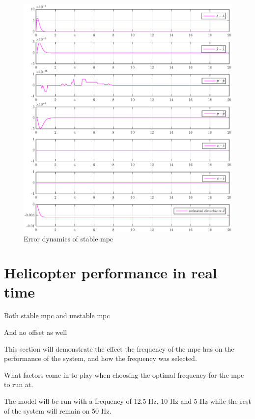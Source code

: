 \begin{figure}[h!]
    \centering
    \includegraphics[scale=0.5]{fig/heli_sim_est_stable_error_plot.eps}
    \caption{Error dynamics of stable \acrshort{mpc}}
    \label{fig:my_label}
\end{figure}



\section{Helicopter performance in real time }



Both stable \acrshort{mpc} and unstable \acrshort{mpc}

And no offset as well

This section will demonstrate the effect the frequency of the \acrshort{mpc} has on the performance of the system, and how the frequency was selected. 

What factors come in to play when choosing the optimal frequency for the \acrshort{mpc} to run at.

The model will be run with a frequency of 12.5 Hz, 10 Hz and 5 Hz while the rest of the system will remain on 50 Hz. 

